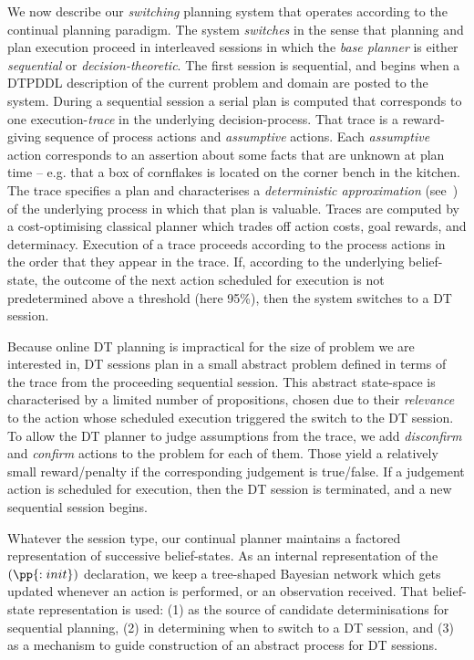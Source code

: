
\newcommand{\entropy}{\ensuremath{\mathrm{H}}}


We now describe our {\em switching} planning system that operates
according to the continual planning paradigm. The system {\em
  switches} in the sense that planning and plan execution proceed in
interleaved sessions in which the {\em base planner} is either {\em
  sequential} or {\em decision-theoretic}.  The first session is
sequential, and begins when a DTPDDL description of the current
problem and domain are posted to the system.  During a sequential
session a serial plan is computed that corresponds to one
execution-{\em trace} in the underlying decision-process. That trace
is a reward-giving sequence of process actions and {\em assumptive}
actions. Each {\em assumptive} action corresponds to an assertion
about some facts that are unknown at plan time -- e.g. that a box of
cornflakes is located on the corner bench in the kitchen. The trace
specifies a plan and characterises a {\em deterministic approximation}
(see~\cite{yoon:etal:2008}) of the underlying process in which that
plan is valuable. Traces are computed by a cost-optimising classical
planner which trades off action costs, goal rewards, and
determinacy. Execution of a trace proceeds according to the process
actions in the order that they appear in the trace. If, according to
the underlying belief-state, the outcome of the next action scheduled
for execution is not predetermined above a threshold (here 95\%), then
the system switches to a DT session.

Because online DT planning is impractical for the size of problem we
are interested in, DT sessions plan in a small abstract problem
defined in terms of the trace from the proceeding sequential
session. This abstract state-space is characterised by a limited
number of propositions, chosen due to their {\em relevance} to the
action whose scheduled execution triggered the switch to the DT
session.  To allow the DT planner to judge assumptions from the trace,
we add {\em disconfirm} and {\em confirm} actions to the problem for
each of them. Those yield a relatively small reward/penalty if the
corresponding judgement is true/false. If a judgement action is
scheduled for execution, then the DT session is terminated, and a new
sequential session begins.

Whatever the session type, our continual planner maintains a factored
representation of successive belief-states.  As an internal
representation of the $(\pp{:init})$ declaration, we keep a
tree-shaped Bayesian network which gets updated whenever an action is
performed, or an observation received. That belief-state
representation is used: (1) as the source of candidate
determinisations for sequential planning, (2) in determining when to
switch to a DT session, and (3) as a mechanism to guide construction
of an abstract process for DT sessions.

